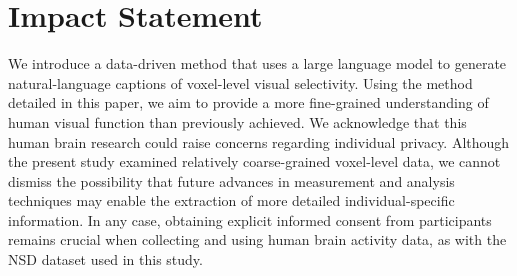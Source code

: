 \clearpage
\section*{Impact Statement}
We introduce a data-driven method that uses a large language model to generate natural-language captions of voxel-level visual selectivity. Using the method detailed in this paper, we aim to provide a more fine-grained understanding of human visual function than previously achieved. 
We acknowledge that this human brain research could raise concerns regarding individual privacy. Although the present study examined relatively coarse-grained voxel-level data, we cannot dismiss the possibility that future advances in measurement and analysis techniques may enable the extraction of more detailed individual-specific information. In any case, obtaining explicit informed consent from participants remains crucial when collecting and using human brain activity data, as with the NSD dataset used in this study.
